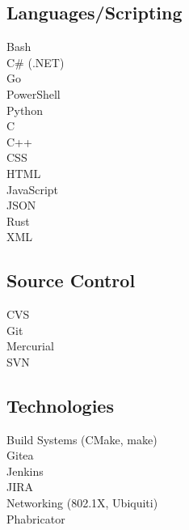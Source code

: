 \documentclass[]{formatting}
\begin{document}
\begin{minipage}[t]{0.33\textwidth}
\subsection{Languages/Scripting}
\textbullet{} Bash \\
\textbullet{} C\# (.NET) \\
\textbullet{} Go \\
\textbullet{} PowerShell \\
\textbullet{} Python \\
\textbullet{} C \\
\textbullet{} C++ \\
\textbullet{} CSS \\
\textbullet{} HTML \\
\textbullet{} JavaScript \\
\textbullet{} JSON \\
\textbullet{} Rust \\
\textbullet{} XML
\sectionsep

\subsection{Source Control}
\textbullet{} CVS \\
\textbullet{} Git \\
\textbullet{} Mercurial \\
\textbullet{} SVN
\sectionsep

\subsection{Technologies}
\textbullet{} Build Systems (CMake, make) \\
\textbullet{} Gitea \\
\textbullet{} Jenkins \\
\textbullet{} JIRA \\
\textbullet{} Networking (802.1X, Ubiquiti) \\
\textbullet{} Phabricator
\sectionsep

%
%

\end{minipage}
\hfill
\end{document}
